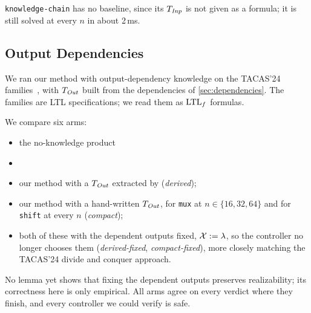 \begin{table}[H]
\centering

\caption{Knowledge against no knowledge ( against ) at the largest $n$, one row per slippery arm. Where the no-knowledge side times out () the speed-up is a lower bound ($\ge$). A side with any timed-out cell reads , the  columns included.  is full synthesis; its stages column is the sum of its internal stage times, the only form the sweep records.}\label{tab:rq2}
\end{table}

\texttt{knowledge-chain} has no baseline, since its $T_{\mathit{Inp}}$ is not given as a formula; it is still solved at every $n$ in about 2\,ms.

\subsection{Output Dependencies}\label{sec:outdep-results}

We ran our method with output-dependency knowledge on the TACAS'24 families~\cite{AkshayBCF2024}, with $T_{\mathit{Out}}$ built from the dependencies of \cref{sec:dependencies}.
The families are LTL specifications; we read them as $\text{LTL}_f$ formulas.

We compare six arms:
\begin{itemize}
\item the no-knowledge product
\item {}
\item our method with a $T_{\mathit{Out}}$ extracted by  (\emph{derived});
\item our method with a hand-written $T_{\mathit{Out}}$, for \texttt{mux} at $n \in \{16, 32, 64\}$ and for \texttt{shift} at every $n$ (\emph{compact});
\item both of these with the dependent outputs fixed, $\mathcal{X} := \lambda$, so the controller no longer chooses them (\emph{derived-fixed}, \emph{compact-fixed}), more closely matching the TACAS'24 divide and conquer approach.
\end{itemize}
No lemma yet shows that fixing the dependent outputs preserves realizability; its correctness here is only empirical.
All arms agree on every verdict where they finish, and every controller we could verify is safe.


